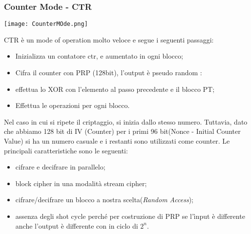 \documentclass{article}
\theoremstyle{remark}
\begin{document}
\subsubsection{Counter Mode - CTR}
\begin{center}
	\texttt{[image: CounterMOde.png]}
\end{center}
CTR è un mode of operation molto veloce e segue i seguenti passaggi:
\begin{itemize}
	\item Inizializza un contatore ctr, e aumentato in ogni blocco;
	\item Cifra il counter con PRP (128bit), l'output è pseudo random :
	\item effettua lo XOR con l'elemento al passo precedente e il blocco PT;
	\item Effettua le operazioni per ogni blocco.
\end{itemize}
Nel caso in cui si ripete il criptaggio, si inizia dallo stesso numero. Tuttavia, dato che abbiamo 128 bit di IV (Counter) per i primi 96 bit(Nonce - Initial Counter Value) si ha un numero casuale e i restanti sono utilizzati come counter.
Le principali caratteristiche sono le seguenti:\begin{itemize}
	\item cifrare e decifrare in parallelo;
	\item block cipher in una modalità stream cipher;
	\item cifrare/decifrare un blocco a nostra scelta(\emph{Random Access});
	\item assenza degli shot cycle perché per costruzione di PRP se l'ìnput è differente anche l'output è differente con in ciclo di $2^{n}$.
\end{itemize}
\end{document}

